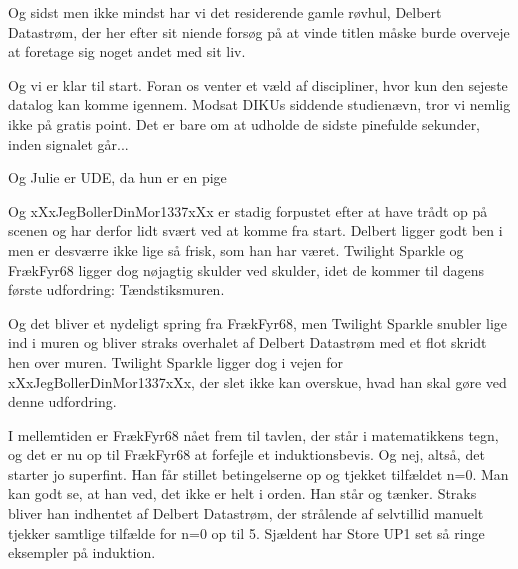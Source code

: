 \documentclass[a4paper,11pt]{article}
\begin{document}
\begin{sketch}


 Og sidst men ikke mindst har vi det residerende gamle røvhul, Delbert Datastrøm, der her efter sit niende forsøg på at vinde titlen måske burde overveje at foretage sig noget andet med sit liv.




 Og vi er klar til start. Foran os venter et væld af discipliner, hvor kun den sejeste datalog kan komme igennem. Modsat DIKUs siddende studienævn, tror vi nemlig ikke på gratis point. Det er bare om at udholde de sidste pinefulde sekunder, inden signalet går...




 Og Julie er UDE, da hun er en pige




 Og xXxJegBollerDinMor1337xXx er stadig forpustet efter at have trådt op på scenen og har derfor lidt svært ved at komme fra start. Delbert ligger godt ben i men er desværre ikke lige så frisk, som han har været. Twilight Sparkle og FrækFyr68 ligger dog nøjagtig skulder ved skulder, idet de kommer til dagens første udfordring: Tændstiksmuren.




 Og det bliver et nydeligt spring fra FrækFyr68, men Twilight Sparkle snubler lige ind i muren og bliver straks overhalet af Delbert Datastrøm med et flot skridt hen over muren. Twilight Sparkle ligger dog i vejen for xXxJegBollerDinMor1337xXx, der slet ikke kan overskue, hvad han skal gøre ved denne udfordring.




 I mellemtiden er FrækFyr68 nået frem til tavlen, der står i matematikkens tegn, og det er nu op til FrækFyr68 at forfejle et induktionsbevis. Og nej, altså, det starter jo superfint. Han får stillet betingelserne op og tjekket tilfældet n=0. Man kan godt se, at han ved, det ikke er helt i orden. Han står og tænker. Straks bliver han indhentet af Delbert Datastrøm, der strålende af selvtillid manuelt tjekker samtlige tilfælde for n=0 op til 5. Sjældent har Store UP1 set så ringe eksempler på induktion.



\end{sketch}
\end{document}
